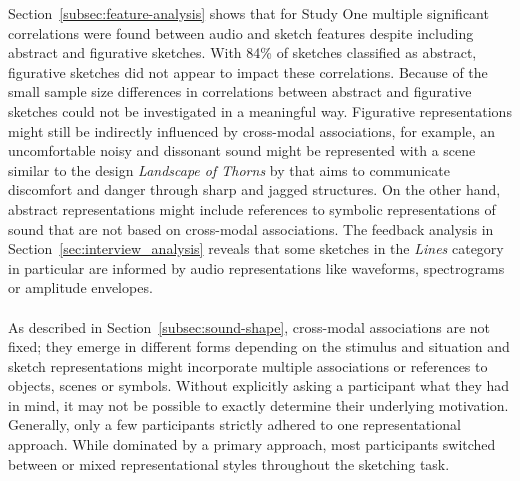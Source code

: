 \documentclass[]{interact}
\theoremstyle{plain}%
\theoremstyle{definition}
\theoremstyle{remark}
\begin{document}
Section~\ref{subsec:feature-analysis} shows that for Study One multiple significant correlations were found between audio and sketch features despite including abstract and figurative sketches. With 84{\%} of sketches classified as abstract, figurative sketches did not appear to impact these correlations. Because of the small sample size differences in correlations between abstract and figurative sketches could not be investigated in a meaningful way. Figurative representations might still be indirectly influenced by cross-modal associations, for example, an uncomfortable noisy and dissonant sound might be represented with a scene similar to the design \textit{Landscape of Thorns} by  that aims to communicate discomfort and danger through sharp and jagged structures. On the other hand, abstract representations might include references to symbolic representations of sound that are not based on cross-modal associations. The feedback analysis in Section~\ref{sec:interview_analysis} reveals that some sketches in the \textit{Lines} category in particular are informed by audio representations like waveforms, spectrograms or amplitude envelopes. 
\\ \\
As described in Section~\ref{subsec:sound-shape}, cross-modal associations are not fixed; they emerge in different forms depending on the stimulus and situation and sketch representations might incorporate multiple associations or references to objects, scenes or symbols. Without explicitly asking a participant what they had in mind, it may not be possible to exactly determine their underlying motivation. Generally, only a few participants strictly adhered to one representational approach. While dominated by a primary approach, most participants switched between or mixed representational styles throughout the sketching task.
\end{document}
